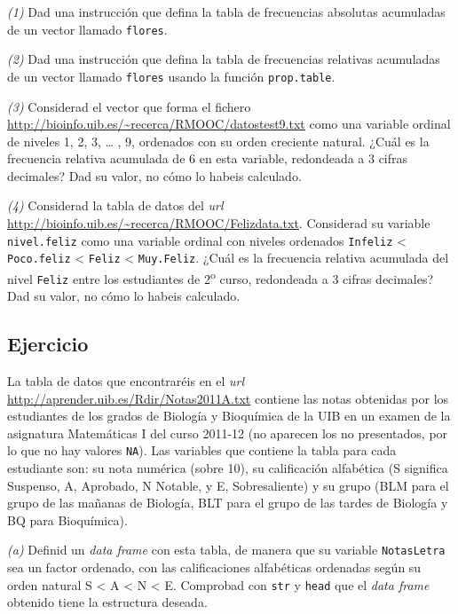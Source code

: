 \documentclass[
]{book}
\theoremstyle{definition}
\theoremstyle{definition}
\theoremstyle{definition}
\theoremstyle{remark}
\begin{document}
\emph{(1)} Dad una instrucción que defina la tabla de frecuencias absolutas acumuladas de un vector llamado \texttt{flores}.

\emph{(2)} Dad una instrucción que defina la tabla de frecuencias relativas acumuladas de un vector llamado \texttt{flores} usando la función \texttt{prop.table}.

\emph{(3)} Considerad el vector que forma el fichero \url{http://bioinfo.uib.es/~recerca/RMOOC/datostest9.txt} como una variable ordinal de niveles 1, 2, 3, \ldots{} , 9, ordenados con su orden creciente natural. ¿Cuál es la frecuencia relativa acumulada de 6 en esta variable, redondeada a 3 cifras decimales? Dad su valor, no cómo lo habeis calculado.

\emph{(4)} Considerad la tabla de datos del \emph{url} \url{http://bioinfo.uib.es/~recerca/RMOOC/Felizdata.txt}. Considerad su variable \texttt{nivel.feliz} como una variable ordinal con niveles ordenados \texttt{Infeliz} \textless{} \texttt{Poco.feliz} \textless{} \texttt{Feliz} \textless{} \texttt{Muy.Feliz}. ¿Cuál es la frecuencia relativa acumulada del nivel \texttt{Feliz} entre los estudiantes de 2\textsuperscript{o} curso, redondeada a 3 cifras decimales? Dad su valor, no cómo lo habeis calculado.

\hypertarget{ejercicio-8}{%
\subsection*{Ejercicio}\label{ejercicio-8}}

La tabla de datos que encontraréis en el \emph{url} \url{http://aprender.uib.es/Rdir/Notas2011A.txt} contiene las notas obtenidas por los estudiantes de los grados de Biología y Bioquímica de la UIB en un examen de la asignatura Matemáticas I del curso 2011-12 (no aparecen los no presentados, por lo que no hay valores \texttt{NA}). Las variables que contiene la tabla para cada estudiante son: su nota numérica (sobre 10), su calificación alfabética (S significa Suspenso, A, Aprobado, N Notable, y E, Sobresaliente) y su grupo (BLM para el grupo de las mañanas de Biología, BLT para el grupo de las tardes de Biología y BQ para Bioquímica).

\emph{(a)} Definid un \emph{data frame} con esta tabla, de manera que su variable \texttt{NotasLetra} sea un factor ordenado, con las calificaciones alfabéticas ordenadas según su orden natural S \textless{} A \textless{} N \textless{} E. Comprobad con \texttt{str} y \texttt{head} que el \emph{data frame} obtenido tiene la estructura deseada.
\end{document}
